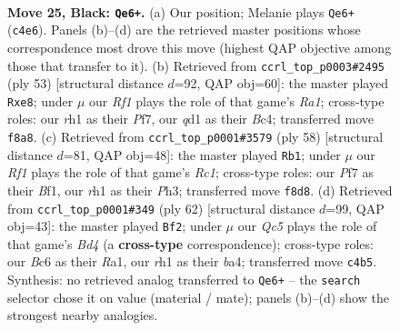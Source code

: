 \documentclass[11pt]{article}
\begin{document}
\clearpage

\begin{figure}[p]\centering
\begin{subfigure}{0.46\textwidth}\centering
\resizebox{\linewidth}{!}{%
\newchessgame
\chessboard[
  setfen={5rk1/p4pb1/2bp4/7p/P1q4P/4p2K/1r3B2/2RQ3R b - - 1 25},
  showmover=false,
  pgfstyle=straightmove, color=movearrow, markmove={c4-e6}
]}
\caption{}
\end{subfigure}\hfill
\begin{subfigure}{0.46\textwidth}\centering
\resizebox{\linewidth}{!}{%
\newchessgame
\chessboard[
  setfen={r3B1k1/5p2/6p1/8/p1b5/2b1q1PP/PPQ4K/2RR4 b - - 0 27},
  showmover=false,
  pgfstyle=straightmove, color=movearrow, markmove={a8-e8}
]}
\caption{}
\end{subfigure}
\\[4pt]
\begin{subfigure}{0.46\textwidth}\centering
\resizebox{\linewidth}{!}{%
\newchessgame
\chessboard[
  setfen={1r3rk1/1b1p3p/3Qp3/6p1/2R2P1q/7P/P4P2/2R2BK1 w - - 2 30},
  showmover=false,
  pgfstyle=straightmove, color=movearrow, markmove={c1-b1}
]}
\caption{}
\end{subfigure}\hfill
\begin{subfigure}{0.46\textwidth}\centering
\resizebox{\linewidth}{!}{%
\newchessgame
\chessboard[
  setfen={3r2k1/4qpp1/1Q5p/8/b1rBP3/5P2/6PP/R4RK1 w - - 2 32},
  showmover=false,
  pgfstyle=straightmove, color=movearrow, markmove={d4-f2}
]}
\caption{}
\end{subfigure}
\caption{\textbf{Move 25, Black: \texttt{Qe6+}.} (a) Our position; Melanie plays \texttt{Qe6+} (\texttt{c4e6}). Panels (b)--(d) are the retrieved master positions whose correspondence most drove this move (highest QAP objective among those that transfer to it). (b) Retrieved from \texttt{ccrl\_top\_p0003\#2495} (ply 53) [structural distance $d$=92, QAP obj=60]: the master played \texttt{Rxe8}; under $\mu$ our \emph{Rf1} plays the role of that game's \emph{Ra1}; cross-type roles: our \emph{r}h1 as their \emph{P}f7, our \emph{q}d1 as their \emph{B}c4; transferred move \texttt{f8a8}. (c) Retrieved from \texttt{ccrl\_top\_p0001\#3579} (ply 58) [structural distance $d$=81, QAP obj=48]: the master played \texttt{Rb1}; under $\mu$ our \emph{Rf1} plays the role of that game's \emph{Rc1}; cross-type roles: our \emph{P}f7 as their \emph{B}f1, our \emph{r}h1 as their \emph{P}h3; transferred move \texttt{f8d8}. (d) Retrieved from \texttt{ccrl\_top\_p0001\#349} (ply 62) [structural distance $d$=99, QAP obj=43]: the master played \texttt{Bf2}; under $\mu$ our \emph{Qc5} plays the role of that game's \emph{Bd4} (a \textbf{cross-type} correspondence); cross-type roles: our \emph{B}c6 as their \emph{R}a1, our \emph{r}h1 as their \emph{b}a4; transferred move \texttt{c4b5}. Synthesis: no retrieved analog transferred to \texttt{Qe6+} -- the \texttt{search} selector chose it on value (material / mate); panels (b)--(d) show the strongest nearby analogies.}
\label{fig:thought-m49}
\end{figure}
\end{document}
